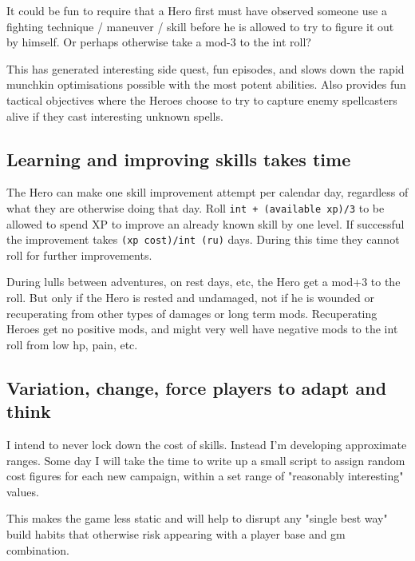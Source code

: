 It could be fun to require that a Hero first must have observed someone use a fighting technique / maneuver / skill before he is allowed to try to figure it out by himself. Or perhaps otherwise take a mod-3 to the int roll?

This has generated interesting side quest, fun episodes, and slows down the rapid munchkin optimisations possible with the most potent abilities. Also provides fun tactical objectives where the Heroes choose to try to capture enemy spellcasters alive if they cast interesting unknown spells.


\subsection*{Learning and improving skills takes time}
The Hero can make one skill improvement attempt per calendar day, regardless of what they are otherwise doing that day.
Roll \verb|int + (available xp)/3| to be allowed to spend XP to improve an already known skill by one level. If successful the improvement takes
\verb|(xp cost)/int (ru)| days. During this time they cannot roll for further improvements.

During lulls between adventures, on rest days, etc, the Hero get a mod+3 to the roll. But only if the Hero is rested and undamaged, not if he is wounded or recuperating from other types of damages or long term mods. Recuperating Heroes get no positive mods, and might very well have negative mods to the int roll from low hp, pain, etc.


\subsection*{Variation, change, force players to adapt and think}
I intend to never lock down the cost of skills. Instead I'm developing approximate ranges. Some day I will take the time to write up a small script to assign random cost figures for each new campaign, within a set range of "reasonably interesting" values.

This makes the game less static and will help to disrupt any "single best way" build habits that otherwise risk appearing with a player base and gm combination.





%









